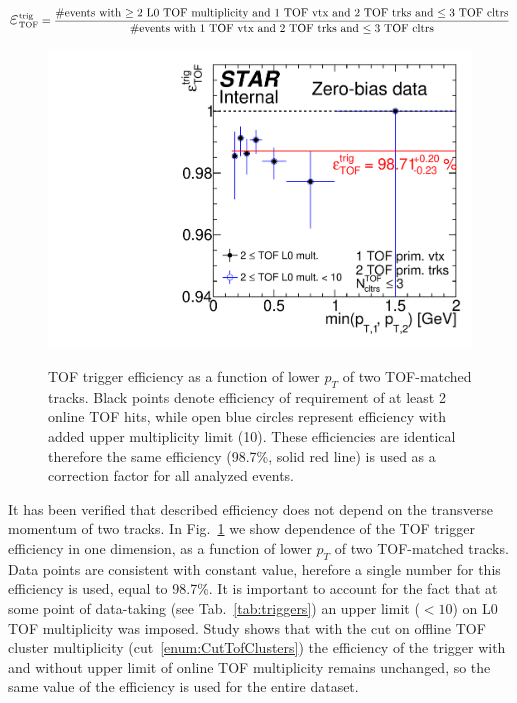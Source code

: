 \begin{equation}
 \mbox{\LARGE$\varepsilon$}_{\text{TOF}}^{\text{trig}} = \frac{\text{\#events with $\geq2$ L0 TOF multiplicity and 1 TOF vtx and 2 TOF trks and $\leq3$ TOF cltrs}}{\text{\#events with 1 TOF vtx and 2 TOF trks and $\leq3$ TOF cltrs}}
\end{equation}

\begin{figure}[ht!]
\centering%
\parbox{0.4725\textwidth}{%
  \centering%
  \includegraphics[width=\linewidth]{graphics/corrections/TofTrigEff_Final.pdf}\label{fig:tofTrigEff} 
}%
\quad%
\parbox{0.4725\textwidth}{%
    \caption[TOF trigger efficiency as a function of lower $p_{T}$ of two TOF-matched tracks.]{TOF trigger efficiency as a function of lower $p_{T}$ of two TOF-matched tracks. Black points denote efficiency of requirement of at least 2 online TOF hits, while open blue circles represent efficiency with added upper multiplicity limit (10). These efficiencies are identical therefore the same efficiency (98.7\%, solid red line) is used as a correction factor for all analyzed events.}\label{fig:tofTrigEff2}%
}
\end{figure}

It has been verified that described efficiency does not depend on the transverse momentum of two tracks. In Fig.~\ref{fig:tofTrigEff2} we show dependence of the TOF trigger efficiency in one dimension, as a function of lower $p_{T}$ of two TOF-matched tracks. Data points are consistent with constant value, herefore a single number for this efficiency is used, equal to 98.7\%. It is important to account for the fact that at some point of data-taking (see Tab.~\ref{tab:triggers}) an upper limit ($<10$) on L0 TOF multiplicity was imposed. Study shows that with the cut on offline TOF cluster multiplicity (cut~\ref{enum:CutTofClusters}) the efficiency of the trigger with and without upper limit of online TOF multiplicity remains unchanged, so the same value of the efficiency is used for the entire dataset.



